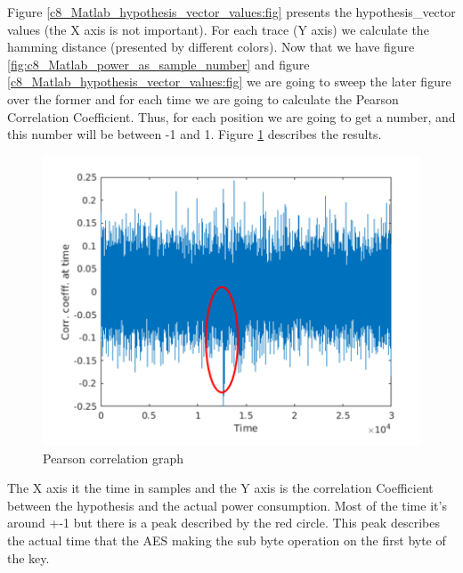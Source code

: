 Figure \ref{c8_Matlab_hypothesis_vector_values:fig} presents the hypothesis\_vector values (the X axis is not important). For each trace (Y axis) we calculate the hamming distance (presented by different colors). 
Now that we have figure \ref{fig:c8_Matlab_power_as_sample_number} and figure \ref{c8_Matlab_hypothesis_vector_values:fig} we are going to sweep the later figure over the former and for  each time we are going to calculate the Pearson Correlation Coefficient. Thus, for each position we are going to get a number, and this number will be between -1 and 1. Figure \ref{c8_Matlab_pearson_correlation:fig} describes the results. 
\begin{figure}[!ht]
    \centering
    \includegraphics[width=1.0\textwidth]{images/chapter8/pearson_correlation_numbers.png}
    \caption{Pearson correlation graph} \label{c8_Matlab_pearson_correlation:fig}
\end{figure}
The X axis it the time in samples and the Y axis is the correlation Coefficient between the hypothesis and the actual power consumption. Most of the time it's around +-1 but there is a peak described by the red circle. This peak describes the actual time that the AES making the sub byte operation on the first byte of the key. 

